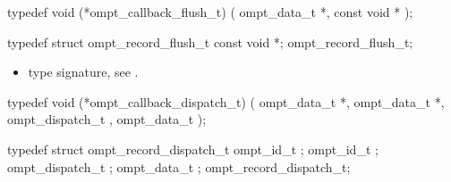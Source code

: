 \label{sec:ompt_callback_flush_t}
\format

\begin{ccppspecific}
\begin{omptCallback}
typedef void (*ompt_callback_flush_t) (
  ompt_data_t *,
  const void *
);
\end{omptCallback}
\end{ccppspecific}


\record

\begin{ccppspecific}
\begin{omptRecord}
typedef struct ompt_record_flush_t {
  const void *;
} ompt_record_flush_t;
\end{omptRecord}
\end{ccppspecific}


\argdesc

\codeptrdesc

\crossreferences
\begin{itemize}
\item {} type signature, see
.
\end{itemize}



\label{sec:ompt_callback_dispatch_t}
\format

\begin{ccppspecific}
\begin{omptCallback}
typedef void (*ompt_callback_dispatch_t) (
  ompt_data_t *,
  ompt_data_t *,
  ompt_dispatch_t ,
  ompt_data_t  
);
\end{omptCallback}
\end{ccppspecific}


\record

\begin{ccppspecific}
\begin{omptRecord}
typedef struct ompt_record_dispatch_t {
  ompt_id_t ;
  ompt_id_t ;
  ompt_dispatch_t ;
  ompt_data_t ; 
} ompt_record_dispatch_t;
\end{omptRecord}
\end{ccppspecific}


\argdesc


